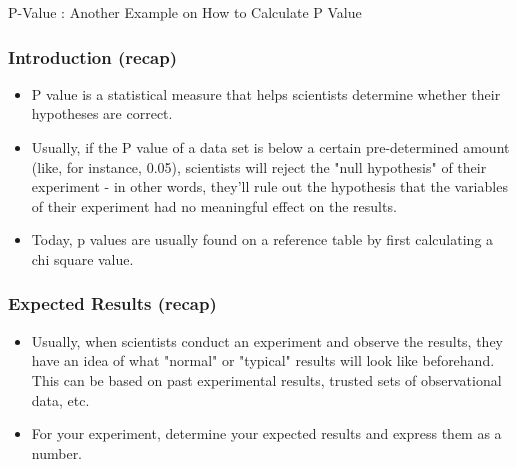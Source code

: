 \begin{frame}
\begin{center}
{\Large P-Value : Another Example on How to Calculate P Value}
\end{center}
\end{frame}

\begin{frame}
\frametitle{Introduction (recap)}

\begin{itemize}
\item P value is a statistical measure that helps scientists determine whether their hypotheses are correct.
\item Usually, if the P value of a data set is below a certain pre-determined amount (like, for instance, 0.05), scientists will reject the "null hypothesis" of their experiment - in other words, they'll rule out the hypothesis that the variables of their experiment had no meaningful effect on the results. 
\item Today, p values are usually found on a reference table by first calculating a chi square value.

\end{itemize}
\end{frame}

\begin{frame}
\frametitle{Expected Results (recap)}

\begin{itemize}
\item Usually, when scientists conduct an experiment and observe the results, they have an idea of what "normal" or "typical" results will look like beforehand. This can be based on past experimental results, trusted sets of observational data, etc.
\item For your experiment, determine your expected results and express them as a number.
\end{itemize}
\end{frame}

